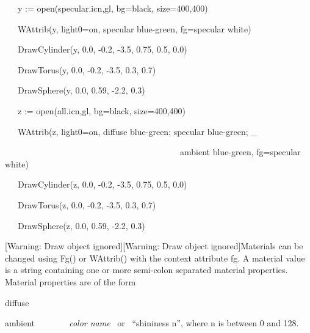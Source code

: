 \documentclass[letterpaper]{article}
\begin{document}
\bigskip

{\sffamily
\ \ \ y := open({\textquotedbl}specular.icn{\textquotedbl},{\textquotedbl}gl{\textquotedbl},
{\textquotedbl}bg=black{\textquotedbl}, {\textquotedbl}size=400,400{\textquotedbl})}

{\sffamily
\ \ \ WAttrib(y, {\textquotedbl}light0=on, specular blue-green{\textquotedbl}, {\textquotedbl}fg=specular
white{\textquotedbl})}

{\sffamily
\ \ \ DrawCylinder(y, 0.0, -0.2, -3.5, 0.75, 0.5, 0.0)}

{\sffamily
\ \ \ DrawTorus(y, 0.0, -0.2, -3.5, 0.3, 0.7)}

{\sffamily
\ \ \ DrawSphere(y, 0.0, 0.59, -2.2, 0.3)}


\bigskip

{\sffamily
\ \ \ z := open({\textquotedbl}all.icn{\textquotedbl},{\textquotedbl}gl{\textquotedbl},
{\textquotedbl}bg=black{\textquotedbl}, {\textquotedbl}size=400,400{\textquotedbl})}

{\sffamily
\ \ \ WAttrib(z, {\textquotedbl}light0=on, diffuse blue-green; specular blue-green; \_}

{\sffamily
\ \ \ \ \ \ \ \ \ \ \ \ \ \ \ \ \ \ \ \ \ \ \ \ \ \ \ \ \ \ \ \ \ \ \ \ \ \ \ \ \ ambient blue-green{\textquotedbl},
{\textquotedbl}fg=specular white{\textquotedbl})}

{\sffamily
\ \ \ DrawCylinder(z, 0.0, -0.2, -3.5, 0.75, 0.5, 0.0)}

{\sffamily
\ \ \ DrawTorus(z, 0.0, -0.2, -3.5, 0.3, 0.7)}

{\sffamily
\ \ \ DrawSphere(z, 0.0, 0.59, -2.2, 0.3)}


\bigskip

{
[Warning: Draw object ignored][Warning: Draw object ignored]Materials can be changed using \textsf{Fg()} or
\textsf{WAttrib()} with the context attribute \textsf{fg}. A material value is a string containing one or more
semi-colon separated material properties. Material properties are of the form}


\bigskip

{\sffamily
diffuse}

{
\textsf{ambient}\texttt{ }\ \ \ \ \ \ \ \textsf{\textit{color name}} \ or \ \textsf{{}``}\textsf{shininess
n}\textsf{{}''}, where \textsf{n} is between \textsf{0} and \textsf{128}. }
\end{document}
